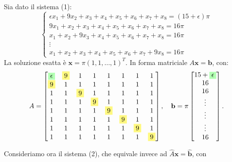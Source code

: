 Sia dato il sistema (1):
$$
\begin{cases}
\epsilon x_1 + 9x_2 + x_3 + x_4 + x_5 + x_6 + x_7 + x_8 = (15+\epsilon)\pi \\
9x_1 + x_2 + x_3 + x_4 + x_5 + x_6 + x_7 + x_8 = 16\pi \\
x_1 + x_2 + 9x_3 + x_4 + x_5 + x_6 + x_7 + x_8 = 16\pi \\
\vdots \\
x_1 + x_2 + x_3 + x_4 + x_5 + x_6 + x_7 + 9x_8 = 16\pi
\end{cases}
$$
La soluzione esatta è $\mathbf{x} = \pi(1, 1, \dots, 1)^T$.
In forma matriciale $A\mathbf{x} = \mathbf{b}$, con:
\[
A = 
\begin{bmatrix}
\colorbox{green!30}{$\epsilon$} & \colorbox{yellow!50}{9} & 1 & 1 & 1 & 1 & 1 & 1 \\
\colorbox{yellow!50}{9} & 1 & 1 & 1 & 1 & 1 & 1 & 1 \\
1 & 1 & \colorbox{yellow!50}{9} & 1 & 1 & 1 & 1 & 1 \\
1 & 1 & 1 & \colorbox{yellow!50}{9} & 1 & 1 & 1 & 1 \\
1 & 1 & 1 & 1 & \colorbox{yellow!50}{9} & 1 & 1 & 1 \\
1 & 1 & 1 & 1 & 1 & \colorbox{yellow!50}{9} & 1 & 1 \\
1 & 1 & 1 & 1 & 1 & 1 & \colorbox{yellow!50}{9} & 1 \\
1 & 1 & 1 & 1 & 1 & 1 & 1 & \colorbox{yellow!50}{9}
\end{bmatrix}
, \quad
\mathbf{b} = \pi
\begin{bmatrix}
15+\colorbox{green!30}{$\epsilon$} \\
16 \\
16 \\
\vdots \\
\vdots \\
\vdots \\
16
\end{bmatrix}.
\]

Consideriamo ora il sistema (2), che equivale invece ad $\hat{A}\mathbf{x} = \mathbf{\hat{b}}$, con

